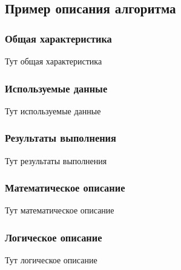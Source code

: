 \subsection{Пример описания алгоритма}

\subsubsection{Общая характеристика}

Тут общая характеристика

\subsubsection{Используемые данные}

Тут используемые данные

\subsubsection{Результаты выполнения}

Тут результаты выполнения

\subsubsection{Математическое описание}

Тут математическое описание

\subsubsection{Логическое описание}

Тут логическое описание
